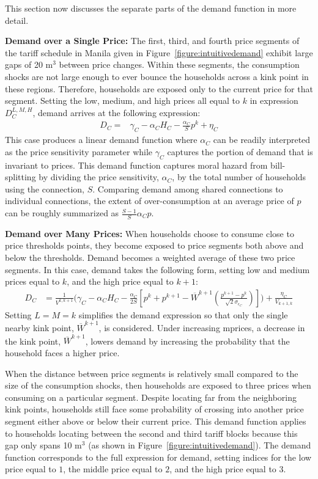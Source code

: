 \documentclass[12pt]{article}
\begin{document}
This section now discusses the separate parts of the demand function in more detail.

\textbf{  Demand over a Single Price:  }  The first, third, and fourth price segments of the tariff schedule in Manila given in Figure~\ref{figure:intuitivedemand} exhibit large gaps of 20 $\text{m}^{3}$ between price changes.  Within these segments, the consumption shocks are not large enough to ever bounce the households across a kink point in these regions.  Therefore, households are exposed only to the current price for that segment.  Setting the low, medium, and high prices all equal to $k$ in expression $D^{L,M,H}_C$, demand arrives at the following expression:
\begin{align*}
  D_C  =& \gamma_C - \alpha_C H_{C} - \frac{\alpha_C}{S} p^k + \eta_C 
\end{align*}
This case produces a linear demand function where $\alpha_C$ can be readily interpreted as the price sensitivity parameter while $\gamma_C$ captures the portion of demand that is invariant to prices.  This demand function captures moral hazard from bill-splitting by dividing the price sensitivity, $\alpha_C$, by the total number of households using the connection, $S$.  Comparing demand among shared connections to individual connections, the extent of over-consumption at an average price of $p$ can be roughly summarized as $\frac{S-1}{S} \alpha_C p $.   

\textbf{ Demand over Many Prices: }  When households choose to consume close to price thresholds points, they become exposed to price segments both above and below the thresholds.  Demand becomes a weighted average of these two price segments.  In this case, demand takes the following form, setting low and medium prices equal to $k$, and the high price equal to $k+1$:
\begin{align*}
D_C &= \frac{ 1}{ V^{k,k+1} } \Big ( \gamma_C - \alpha_C H_{C} - \frac{\alpha_C}{2 S}  [ p^{k} + p^{k+1} - \overline{W}^{k+1} (\frac{p^{k+1} - p^{k}}{\sqrt{2}{\sigma_{\epsilon_C}}})  ]  \Big ) + \frac{ \eta_C }{ V_{k+1,k} } 
\end{align*}
Setting $L=M=k$ simplifies the demand expression so that only the single nearby kink point, $\overline{W}^{k+1}$, is considered.  Under increasing mprices, a decrease in the kink point, $\overline{W}^{k+1}$, lowers demand by increasing the probability that the household faces a higher price.

When the distance between price segments is relatively small compared to the size of the consumption shocks, then households are exposed to three prices when consuming on a particular segment.  Despite locating far from the neighboring kink points, households still face some probability of crossing into another price segment either above or below their current price.  This demand function applies to households locating between the second and third tariff blocks because this gap only spans 10 $\text{m}^{3}$ (as shown in Figure~\ref{figure:intuitivedemand}).  The demand function corresponds to the full expression for demand, setting indices for the low price equal to $1$, the middle price equal to $2$, and the high price equal to $3$.  
\end{document}

